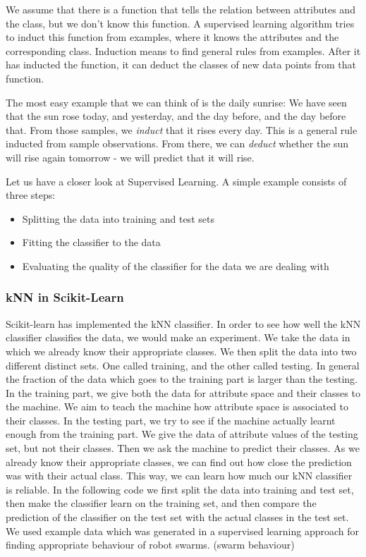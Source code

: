 \documentclass[10pt,a4paper]{article}
\begin{document}
We assume that there is a function that tells the relation between attributes and the class, but we don't know this function. A supervised learning algorithm tries to induct this function from examples, where it knows the attributes and the corresponding class. Induction means to find general rules from examples. After it has inducted the function, it can deduct the classes of new data points from that function.

The most easy example that we can think of is the daily sunrise: We have seen that the sun rose today, and yesterday, and the day before, and the day before that. From those samples, we \textit{induct} that it rises every day. This is a general rule inducted from sample observations. From there, we can \textit{deduct} whether the sun will rise again tomorrow - we will predict that it will rise.

Let us have a closer look at Supervised Learning. A simple example consists of three steps:
\begin{itemize}
\item Splitting the data into training and test sets
\item Fitting the classifier to the data
\item Evaluating the quality of the classifier for the data we are dealing with
\end{itemize}

\subsubsection{kNN in Scikit-Learn}
Scikit-learn has implemented the kNN classifier. In order to see how well the kNN classifier classifies the data, we would make an experiment. We take the  data in which we already know  their appropriate classes. We then split the data into two different distinct sets. One called training, and the other called testing. In general the fraction of the data which goes to the training part is larger than the testing. In the training part, we give both the data for attribute space and their classes to the machine. We aim to teach the machine how attribute space is associated to their classes. In the testing part, we try to see if the machine actually learnt enough from the training part. We give the data of attribute values of the testing set, but not their classes. Then we ask the machine to predict their classes. As we already know their appropriate classes, we can find out how close the prediction was with their actual class. This way, we can learn how much our kNN classifier is reliable. In the following code we first split the data into training and test set, then make the classifier learn on the training set, and then compare the prediction of the classifier on the test set with the actual classes in the test set. We used example data  which was generated in a supervised learning approach for finding appropriate behaviour of robot swarms. (swarm behaviour) 
\label{classifier.py}
\end{document}
